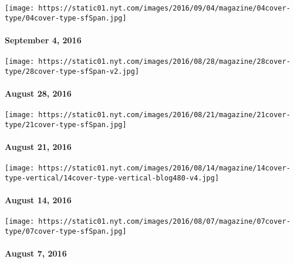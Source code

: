 \href{http://www.nytimes.com/indexes/2016/09/04/magazine/index.html}{}

\texttt{[image: https://static01.nyt.com/images/2016/09/04/magazine/04cover-type/04cover-type-sfSpan.jpg]}

\hypertarget{september-4-2016}{%
\paragraph{September 4, 2016}\label{september-4-2016}}

\href{http://www.nytimes.com/indexes/2016/08/28/magazine/index.html}{}

\texttt{[image: https://static01.nyt.com/images/2016/08/28/magazine/28cover-type/28cover-type-sfSpan-v2.jpg]}

\hypertarget{august-28-2016}{%
\paragraph{August 28, 2016}\label{august-28-2016}}

\href{http://www.nytimes.com/indexes/2016/08/21/magazine/index.html}{}

\texttt{[image: https://static01.nyt.com/images/2016/08/21/magazine/21cover-type/21cover-type-sfSpan.jpg]}

\hypertarget{august-21-2016}{%
\paragraph{August 21, 2016}\label{august-21-2016}}

\href{http://www.nytimes.com/indexes/2016/08/14/magazine/index.html}{}

\texttt{[image: https://static01.nyt.com/images/2016/08/14/magazine/14cover-type-vertical/14cover-type-vertical-blog480-v4.jpg]}

\hypertarget{august-14-2016}{%
\paragraph{August 14, 2016}\label{august-14-2016}}

\href{http://www.nytimes.com/indexes/2016/08/07/magazine/index.html}{}

\texttt{[image: https://static01.nyt.com/images/2016/08/07/magazine/07cover-type/07cover-type-sfSpan.jpg]}

\hypertarget{august-7-2016}{%
\paragraph{August 7, 2016}\label{august-7-2016}}

